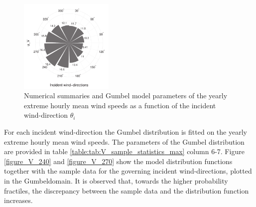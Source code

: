 \begin{figure}[H]
	\includegraphics[width=0.4\textwidth]{images/Schiphol_u_V_test.pdf}
	\caption{Numerical summaries and Gumbel model parameters of the yearly extreme hourly mean wind speeds as a function of the incident wind-direction $\theta_i$}
	\label{fig:compass_summary_wind}
\end{figure}

\noindent
For each incident wind-direction the Gumbel distribution is fitted on the yearly extreme hourly mean wind speeds. The parameters of the Gumbel distribution are provided in table \ref{table:tab:V_sample_statistics_max} column 6-7.                                                       
Figure \ref{figure_V_240} and \ref{figure_V_270} show the model distribution functions together with the sample data for the governing incident wind-directions, plotted in the Gumbeldomain. 
It is observed that, towards the higher probability fractiles, the discrepancy between the sample data and the distribution function increases. 


